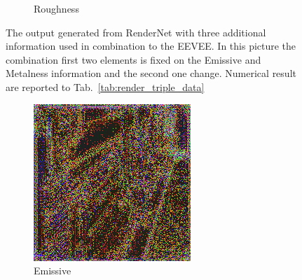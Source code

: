 \begin{figure}[h!]
\begin{subfigure}[b]{0.175\textwidth}
     \caption{Roughness}
    \end{subfigure}
    \caption{The output generated from RenderNet with three additional information used in combination to the EEVEE. In this picture the combination first two elements is fixed on the Emissive and Metalness information and the second one change. Numerical result are reported to Tab.~\ref{tab:render_triple_data}}
    \label{fig:triple_input_base_emissive_metalness}
\end{figure}

\begin{figure}[h!]
    \centering
    \begin{subfigure}[b]{0.175\textwidth}
     \includegraphics[width=\textwidth]{figures/result/quadruple/depth_albedo_normal_emissive/1.png}
     \caption{Emissive}\label{subfig:1}
    \end{subfigure}
    ~
    \begin{subfigure}[b]{0.175\textwidth}

\end{subfigure}
\end{figure}
